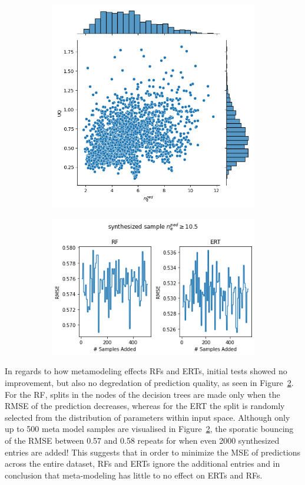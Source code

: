 \documentclass[a4paper, twoside, final, 12pt]{article}
\begin{document}
{\begin{figure}
\begin{subfigure}{0.33\linewidth}
		\includegraphics[scale=0.3]{./src/RF_UQ}
		\caption{}
		\label{subfig:RF_UQ2}
	\end{subfigure}\hfill
	\begin{subfigure}{0.3\linewidth}
		\includegraphics[scale=0.35]{./src/ERT_vs_RF_meta_modeling}
		\caption{}
		\label{subfig:RF_meta_model}
	\end{subfigure}
	\caption{}
	\label{fig:RF_Preds}
\end{figure}

In regards to how metamodeling effects RFs and ERTs, initial tests showed no improvement, but also no degredation of prediction quality, as seen in Figure~\ref{subfig:RF_meta_model}.
For the RF, splits in the nodes of the decision trees are made only when the RMSE of the prediction decreases, whereas for the ERT the split is randomly selected from the distribution of parameters within input space.
Although only up to 500 meta model samples are visualised in Figure~\ref{subfig:RF_meta_model}, the sporatic bouncing of the RMSE between 0.57 and 0.58 repeats for when even 2000 synthesized entries are added!
This suggests that in order to minimize the MSE of predictions across the entire dataset, RFs and ERTs ignore the additional entries and in  conclusion that meta-modeling has little to no effect on ERTs and RFs.


}
\end{document}
